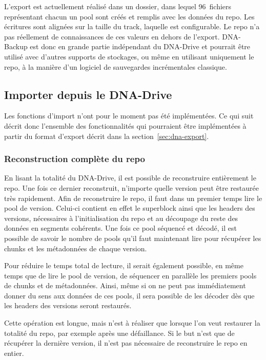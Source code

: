 \documentclass[a4paper]{report}
\begin{document}
L'export est actuellement réalisé dans un dossier, dans lequel 96~fichiers
représentant chacun un pool sont créés et remplis avec les données du repo.
Les écritures sont alignées sur la taille du track, laquelle est configurable.
Le repo n'a pas réellement de connaissances de ces valeurs en dehors de l'export.
DNA-Backup est donc en grande partie indépendant du DNA-Drive
et pourrait être utilisé avec d'autres supports de stockages,
ou même en utilisant uniquement le repo,
à la manière d'un logiciel de sauvegardes incrémentales classique.


\subsection{Importer depuis le DNA-Drive}

Les fonctions d'import n'ont pour le moment pas été implémentées.
Ce qui suit décrit donc l'ensemble des fonctionnalités qui pourraient être implémentées
à partir du format d'export décrit dans la section~\ref{sec:dna-export}.

\subsubsection{Reconstruction complète du repo}

En lisant la totalité du DNA-Drive, il est possible de reconstruire entièrement le repo.
Une fois ce dernier reconstruit, n'importe quelle version peut être restaurée très rapidement.
Afin de reconstruire le repo, il faut dans un premier temps lire le pool de version.
Celui-ci contient en effet le superblock ainsi que les headers des versions,
nécessaires à l'initialisation du repo et au découpage du reste des données en segments cohérents.
Une fois ce pool séquencé et décodé, il est possible de savoir
le nombre de pools qu'il faut maintenant lire pour récupérer les chunks
et les métadonnées de chaque version.

Pour réduire le temps total de lecture, il serait également possible,
en même temps que de lire le pool de version,
de séquencer en parallèle les premiers pools de chunks et de métadonnées.
Ainsi, même si on ne peut pas immédiatement donner du sens aux données de ces pools,
il sera possible de les décoder dès que les headers des versions seront restaurés.

Cette opération est longue, mais n'est à réaliser que lorsque l'on veut restaurer la totalité du repo,
par exemple après une défaillance.
Si le but n'est que de récupérer la dernière version,
il n'est pas nécessaire de reconstruire le repo en entier.
\end{document}

